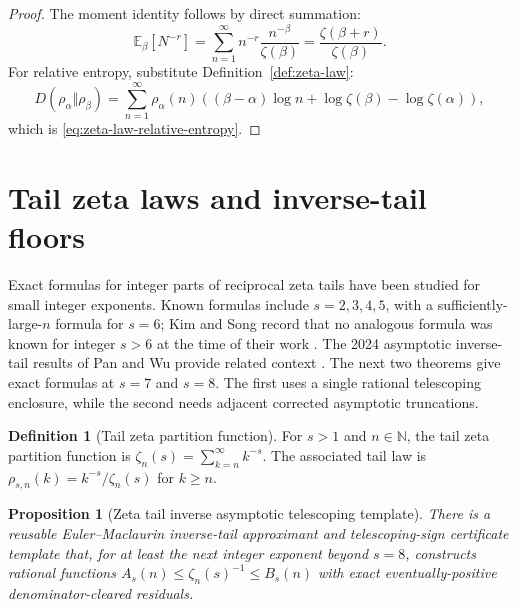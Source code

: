 \documentclass[11pt]{article}
\numberwithin{equation}{section}
\newtheorem{proposition}[theorem]{Proposition}
\theoremstyle{definition}
\newtheorem{definition}{Definition}[section]
\theoremstyle{remark}
\newcommand{\E}{\mathbb E}
\newcommand{\1}{\mathbf 1}
\begin{document}
\begin{proof}
The moment identity follows by direct summation:
\begin{equation}
\label{eq:zeta-law-moment-proof}
\E_\beta[N^{-r}]
=\sum_{n=1}^{\infty}n^{-r}\frac{n^{-\beta}}{\zeta(\beta)}
=\frac{\zeta(\beta+r)}{\zeta(\beta)}.
\end{equation}
For relative entropy, substitute Definition~\ref{def:zeta-law}:
\begin{equation}
\label{eq:zeta-law-relative-entropy-proof}
D(\rho_\alpha\Vert\rho_\beta)
=\sum_{n=1}^{\infty}\rho_\alpha(n)
\left((\beta-\alpha)\log n+\log\zeta(\beta)-\log\zeta(\alpha)\right),
\end{equation}
which is \eqref{eq:zeta-law-relative-entropy}.
\end{proof}

\section{Tail zeta laws and inverse-tail floors}

Exact formulas for integer parts of reciprocal zeta tails have been studied for small integer exponents.  Known formulas include \(s=2,3,4,5\), with a sufficiently-large-\(n\) formula for \(s=6\); Kim and Song record that no analogous formula was known for integer \(s>6\) at the time of their work \cite{kim-song-tail}.  The 2024 asymptotic inverse-tail results of Pan and Wu provide related context \cite{pan-wu-tail}.  The next two theorems give exact formulas at \(s=7\) and \(s=8\).  The first uses a single rational telescoping enclosure, while the second needs adjacent corrected asymptotic truncations.

\begin{definition}[Tail zeta partition function]
\label{def:tail-zeta-partition}
For \(s>1\) and \(n\in\mathbb N\), the tail zeta partition function is \(\zeta_n(s)=\sum_{k=n}^{\infty}k^{-s}\). The associated tail law is \(\rho_{s,n}(k)=k^{-s}/\zeta_n(s)\) for \(k\ge n\).
\end{definition}

\begin{proposition}[Zeta tail inverse asymptotic telescoping template]
\label{res:zeta-tail-inverse-asymptotic-telescoping-template}
There is a reusable Euler--Maclaurin inverse-tail approximant and telescoping-sign certificate template that, for at least the next integer exponent beyond \(s=8\), constructs rational functions \(A_s(n)\le \zeta_n(s)^{-1}\le B_s(n)\) with exact eventually-positive denominator-cleared residuals.
\end{proposition}
\end{document}
